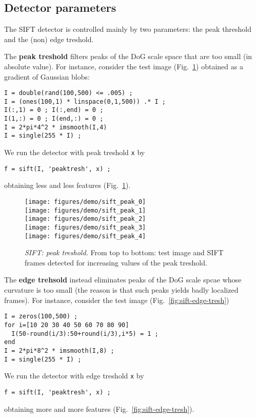 \documentclass[9.5pt]{article}
\begin{document}
\subsection{Detector parameters}\label{sift.parameters}

The SIFT detector is controlled mainly by two parameters: the peak
threshold and the (non) edge treshold. 

The {\bf peak treshold} filters peaks of the DoG scale space that are
too small (in absolute value). For instance, consider the test image
(Fig.~\ref{fig:sift-peak-tresh}) obtained as a gradient of Gaussian
blobs:
\begin{verbatim}
I = double(rand(100,500) <= .005) ;
I = (ones(100,1) * linspace(0,1,500)) .* I ;
I(:,1) = 0 ; I(:,end) = 0 ;
I(1,:) = 0 ; I(end,:) = 0 ;
I = 2*pi*4^2 * imsmooth(I,4)
I = single(255 * I) ;
\end{verbatim}
We run the detector with peak treshold \verb$x$ by
\begin{verbatim}
f = sift(I, 'peaktresh', x) ;
\end{verbatim}
obtaining less and less features (Fig.~\ref{fig:sift-peak-tresh}).

\begin{figure}
\begin{center}
\texttt{[image: figures/demo/sift\_peak\_0]}\\
\texttt{[image: figures/demo/sift\_peak\_1]}\\
\texttt{[image: figures/demo/sift\_peak\_2]}\\
\texttt{[image: figures/demo/sift\_peak\_3]}\\
\texttt{[image: figures/demo/sift\_peak\_4]}
\end{center}
\caption{{\em SIFT: peak treshold.} From top to bottom: test image and
  SIFT frames detected for increasing values of the peak treshold.}
\label{fig:sift-peak-tresh}
\end{figure}

The {\bf edge trehsold} instead eliminates peaks of the DoG scale
spcae whose curvature is too small (the reason is that such peaks
yields badly localized frames). For instance, consider the test image
(Fig.~\ref{fig:sift-edge-tresh})
\begin{verbatim}
I = zeros(100,500) ;
for i=[10 20 30 40 50 60 70 80 90]
  I(50-round(i/3):50+round(i/3),i*5) = 1 ;
end
I = 2*pi*8^2 * imsmooth(I,8) ;
I = single(255 * I) ;
\end{verbatim}
We run the detector with edge treshold \verb$x$ by
\begin{verbatim}
f = sift(I, 'peaktresh', x) ;
\end{verbatim}
obtaining more and more features (Fig.~\ref{fig:sift-edge-tresh}).
\end{document}
